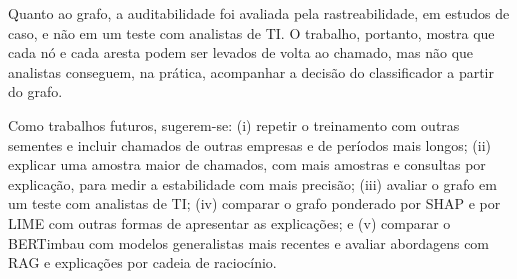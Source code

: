 \documentclass[
    12pt,                %
    openright,           %
    oneside,             %
    a4paper,             %
    english,             %
    brazil               %
]{abntex2}
\begin{document}
Quanto ao grafo, a auditabilidade foi avaliada pela rastreabilidade, em estudos de caso, e não em um teste com analistas de TI. O trabalho, portanto, mostra que cada nó e cada aresta podem ser levados de volta ao chamado, mas não que analistas conseguem, na prática, acompanhar a decisão do classificador a partir do grafo.

Como trabalhos futuros, sugerem-se: (i) repetir o treinamento com outras sementes e incluir chamados de outras empresas e de períodos mais longos; (ii) explicar uma amostra maior de chamados, com mais amostras e consultas por explicação, para medir a estabilidade com mais precisão; (iii) avaliar o grafo em um teste com analistas de TI; (iv) comparar o grafo ponderado por SHAP e por LIME com outras formas de apresentar as explicações; e (v) comparar o BERTimbau com modelos generalistas mais recentes e avaliar abordagens com RAG e explicações por cadeia de raciocínio.

\postextual
\end{document}
